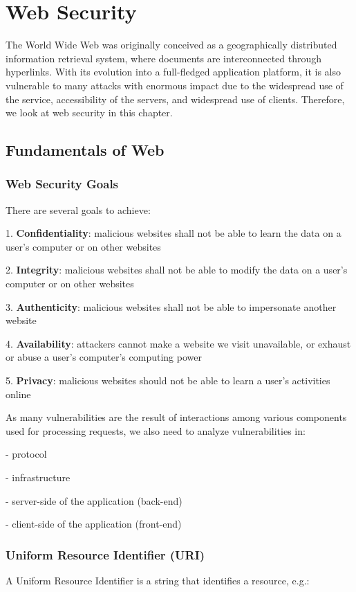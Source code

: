 \chapter{Web Security}

The World Wide Web was originally conceived as a geographically distributed information retrieval system, where documents are interconnected through hyperlinks. With its evolution into a full-fledged application platform, it is also vulnerable to many attacks with enormous impact due to the widespread use of the service, accessibility of the servers, and widespread use of clients. Therefore, we look at web security in this chapter. 

\section{Fundamentals of Web}

\subsection{Web Security Goals}
There are several goals to achieve:

1. \textbf{Confidentiality}: malicious websites shall not be able to learn the data on a user's computer or on other websites 

2. \textbf{Integrity}: malicious websites shall not be able to modify the data on a user's computer or on other websites

3. \textbf{Authenticity}: malicious websites shall not be able to impersonate another website 

4. \textbf{Availability}: attackers cannot make a website we visit unavailable, or exhaust or abuse a user's computer's computing power 

5. \textbf{Privacy}: malicious websites should not be able to learn a user's activities online

As many vulnerabilities are the result of interactions among various components used for processing requests, we also need to analyze vulnerabilities in:

- protocol 

- infrastructure

- server-side of the application (back-end)

- client-side of the application (front-end)

\subsection{Uniform Resource Identifier (URI)}
A Uniform Resource Identifier is a string that identifies a resource, e.g.:

